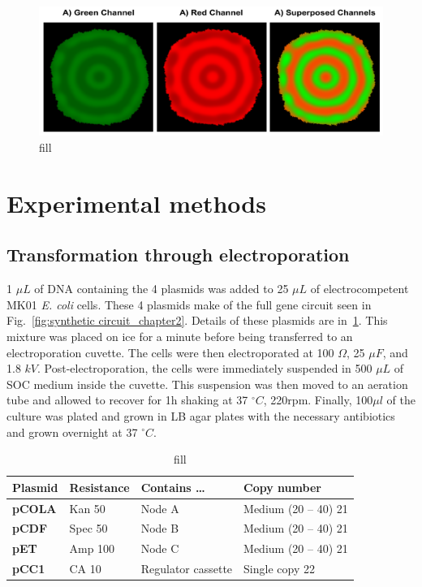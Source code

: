 \begin{figure}[H]

    \includegraphics[width=1\textwidth]{chapters/Methods/redgreesupersposed}
    \caption{fill}
    \label{redgreesupersposed}
\end{figure}




\section{Experimental methods}
\subsection{Transformation through electroporation}\label{electroporation}
1 $\mu L$ of DNA containing the 4 plasmids was added to 25 $\mu L$ of electrocompetent MK01 \textit{E. coli} cells.
These 4 plasmids make of the full gene circuit seen in Fig.~\ref{fig:synthetic circuit_chapter2}.
Details of these plasmids are in~\ref{tab:plasmid table}.
This mixture was placed on ice for a minute before being transferred to an electroporation cuvette.
The cells were then electroporated at 100 $\Omega$, 25 $\mu F$, and 1.8 $kV$.
Post-electroporation, the cells were immediately suspended in 500 $\mu L$ of SOC medium inside the cuvette.
This suspension was then moved to an aeration tube and allowed to recover for 1h shaking at 37 $^{\circ} C$, 220rpm.
Finally, 100$\mu l$ of the culture was plated and grown in LB agar plates with the necessary antibiotics and grown overnight at 37 $^{\circ} C$.

\begin{table}[H]
    \centering
    \begin{tabular}{llll}
        \toprule
        \textbf{Plasmid} & \textbf{Resistance} & \textbf{Contains …} & \textbf{Copy number} \\
        \midrule
        \textbf{pCOLA} & Kan 50 & Node A & Medium (20 – 40) 21 \\
        \textbf{pCDF} & Spec 50 & Node B & Medium (20 – 40) 21 \\
        \textbf{pET} & Amp 100 & Node C & Medium (20 – 40) 21 \\
        \textbf{pCC1} & CA 10 & Regulator cassette & Single copy 22 \\
        \bottomrule
    \end{tabular}
    \caption{fill}
    \label{tab:plasmid table}
\end{table}



